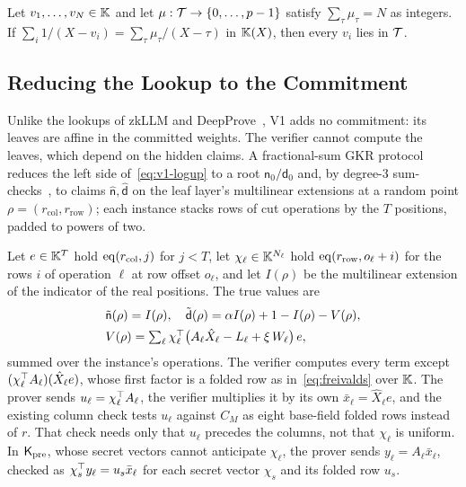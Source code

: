 \begin{lemma}
  \label{lem:v1-logup}
  Let $v_1, \dots, v_N \in \mathbb{K}$ and let $\mu : \mathcal{T} \to \{0, \dots, p-1\}$ satisfy
  $\sum_\tau \mu_\tau = N$ as integers. If $\sum_i 1/(X - v_i) = \sum_\tau \mu_\tau/(X - \tau)$
  in $\mathbb{K}(X)$, then every $v_i$ lies in $\mathcal{T}$.
\end{lemma}

\subsection{Reducing the Lookup to the Commitment}

Unlike the lookups of zkLLM and DeepProve~\cite{zkllm,deepprove}, V1 adds no commitment: its leaves
are affine in the committed weights. The verifier cannot compute the leaves, which
depend on the hidden claims. A fractional-sum GKR
protocol~\cite{gkr,papini2023logupgkr} reduces the left side of~\eqref{eq:v1-logup} to a root
$\mathsf n_0/\mathsf d_0$ and, by degree-3 sum-checks~\cite{lfkn1992}, to claims $\hat{\mathsf n},
\hat{\mathsf d}$ on the leaf layer's multilinear extensions at a random point $\rho =
(r_{\mathrm{col}}, r_{\mathrm{row}})$; each instance stacks rows of cut operations by the $T$
positions, padded to powers of two.

Let $e \in \mathbb{K}^{T}$ hold $\mathrm{eq}(r_{\mathrm{col}}, j)$ for $j < T$, let $\chi_\ell \in
\mathbb{K}^{N_\ell}$ hold $\mathrm{eq}(r_{\mathrm{row}}, o_\ell + i)$ for the rows $i$ of operation $\ell$ at
row offset $o_\ell$, and let $I(\rho)$ be the multilinear extension of the indicator of the real
positions. The true values are
\begin{equation}
  \begin{aligned}
    &\tilde{\mathsf n}(\rho) = I(\rho), \quad
     \tilde{\mathsf d}(\rho) = \alpha I(\rho) + 1 - I(\rho) - V(\rho), \\
    &V(\rho) = \textstyle\sum_{\ell} \chi_\ell^\top \big(A_\ell \hat X_\ell - L_\ell + \xi\, W_\ell\big)\, e ,
  \end{aligned}
  \label{eq:v1-final}
\end{equation}
summed over the instance's operations. The verifier computes every term except $(\chi_\ell^\top
A_\ell)(\hat X_\ell e)$, whose first factor is a folded row as in~\eqref{eq:freivalds} over
$\mathbb{K}$. The prover sends $u_\ell = \chi_\ell^\top A_\ell$, the verifier multiplies it by its own
$\bar x_\ell = \hat X_\ell e$, and the existing column check tests $u_\ell$ against $C_M$ as eight
base-field folded rows instead of $r$. That check needs only that $u_\ell$ precedes the columns,
not that $\chi_\ell$ is uniform. In $\mathsf{K}_{\mathrm{pre}}$, whose secret vectors cannot anticipate $\chi_\ell$, the
prover sends $y_\ell = A_\ell \bar x_\ell$, checked as $\chi_s^\top y_\ell = u_s \bar x_\ell$ for each
secret vector $\chi_s$ and its folded row $u_s$.

